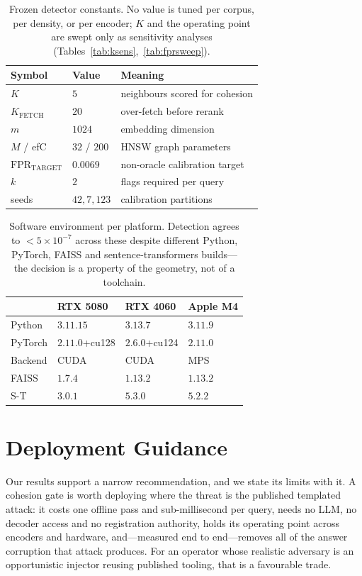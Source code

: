 \documentclass[10pt,journal,compsoc]{IEEEtran}
\begin{document}
\begin{table}[t]
\centering
\caption{Frozen detector constants. No value is tuned per corpus, per density, or per encoder;
$K$ and the operating point are swept only as sensitivity analyses
(Tables~\ref{tab:ksens},~\ref{tab:fprsweep}).}
\label{tab:constants}
\setlength{\tabcolsep}{4pt}
\begin{tabular}{lll}
\toprule
Symbol & Value & Meaning \\
\midrule
$K$ & $5$ & neighbours scored for cohesion \\
$K_{\mathrm{FETCH}}$ & $20$ & over-fetch before rerank \\
$m$ & $1024$ & embedding dimension \\
$M$ / efC & $32$ / $200$ & HNSW graph parameters \\
$\mathrm{FPR}_{\mathrm{TARGET}}$ & $0.0069$ & non-oracle calibration target \\
$k$ & $2$ & flags required per query \\
seeds & $42,7,123$ & calibration partitions \\
\bottomrule
\end{tabular}
\end{table}

\begin{table}[t]
\centering
\caption{Software environment per platform. Detection agrees to $<5\times10^{-7}$ across these
despite different Python, PyTorch, FAISS and sentence-transformers builds---the decision is a
property of the geometry, not of a toolchain.}
\label{tab:env}
\setlength{\tabcolsep}{3.5pt}
\begin{tabular}{llll}
\toprule
 & RTX 5080 & RTX 4060 & Apple M4 \\
\midrule
Python  & $3.11.15$ & $3.13.7$ & $3.11.9$ \\
PyTorch & $2.11.0$+cu128 & $2.6.0$+cu124 & $2.11.0$ \\
Backend & CUDA & CUDA & MPS \\
FAISS   & $1.7.4$ & $1.13.2$ & $1.13.2$ \\
S-T     & $3.0.1$ & $5.3.0$ & $5.2.2$ \\
\bottomrule
\end{tabular}
\end{table}

\section{Deployment Guidance}
\label{app:guidance}
Our results support a narrow recommendation, and we state its limits with it. A cohesion gate is
worth deploying where the threat is the published templated attack: it costs one offline pass and
sub-millisecond per query, needs no LLM, no decoder access and no registration authority, holds
its operating point across encoders and hardware, and---measured end to end---removes all of the
answer corruption that attack produces. For an operator whose realistic adversary is an
opportunistic injector reusing published tooling, that is a favourable trade.
\end{document}
